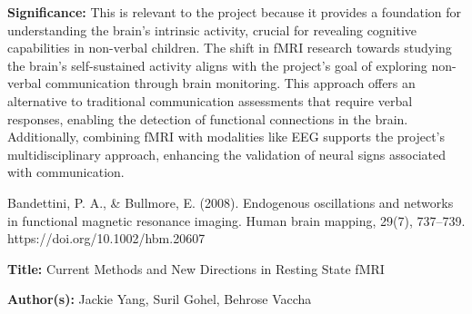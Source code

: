 \documentclass[12pt, research paper]{report}
\begin{document}
	\noindent \textbf{Significance:} This is relevant to the project because it provides a foundation for understanding the brain's intrinsic activity, crucial for revealing cognitive capabilities in non-verbal children. The shift in fMRI research towards studying the brain's self-sustained activity aligns with the project's goal of exploring non-verbal communication through brain monitoring. This approach offers an alternative to traditional communication assessments that require verbal responses, enabling the detection of functional connections in the brain. Additionally, combining fMRI with modalities like EEG supports the project's multidisciplinary approach, enhancing the validation of neural signs associated with communication. 
	\bigskip 
	
	\noindent Bandettini, P. A., \& Bullmore, E. (2008). Endogenous oscillations and networks in functional magnetic resonance imaging. Human brain mapping, 29(7), 737–739. https://doi.org/10.1002/hbm.20607
	\bigskip 
	
	\noindent \textbf{Title:} Current Methods and New Directions in Resting State fMRI
	
	\noindent \textbf{Author(s):} Jackie Yang, Suril Gohel, Behrose Vaccha
	\bigskip 
	
	
\end{document}
